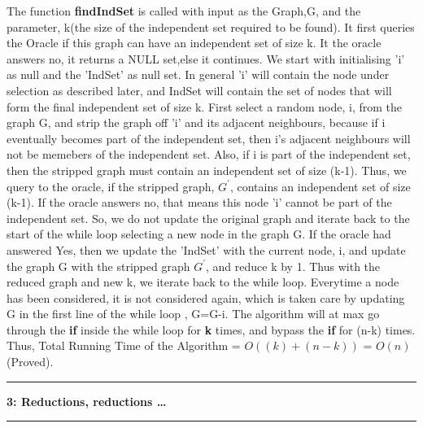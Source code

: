 \documentclass{article}
\newcommand\question[2]{\vspace{.25in}\hrule\textbf{#1: #2}\hrule\vspace{.10in}}
\begin{document}
    The function \textbf {findIndSet} is called with input as the Graph,G, and the parameter, k(the size of the independent set required to be found). It first queries the Oracle if this graph can have an independent set of size k. It the oracle answers no, it returns a NULL set,else it continues. We start with initialising 'i' as null and the 'IndSet' as null set. In general 'i' will contain the node under selection as described later, and IndSet will contain the set of nodes that will form the final independent set of size k. First select a random node, i,  from the graph G, and strip the graph off 'i' and its adjacent neighbours, because if i eventually becomes part of the independent set, then i's adjacent neighbours will not be memebers of the independent set. Also, if i is part of the independent set, then the stripped graph must contain an independent set of size (k-1). Thus, we query to the oracle, if the stripped graph, $G^\prime$, contains an independent set of size (k-1). If the oracle answers no, that means this node 'i' cannot be part of the independent set. So, we do not update the original graph and iterate back to the start of the while loop selecting a new node in the graph G. If the oracle had answered Yes, then we update the 'IndSet' with the current node, i, and update the graph G with the stripped graph $G^\prime$, and reduce k by 1. Thus with the reduced graph and new k, we iterate back to the while loop. Everytime a node has been considered, it is not considered again, which is taken care by updating G in the first line of the while loop , G=G-i. \newline
The algorithm will at max go through the \textbf {if} inside the while loop for \textbf {k} times, and bypass the \textbf {if} for (n-k) times. Thus, \newline
Total Running Time of the Algorithm = $O((k) + (n-k) )$ = $O(n)$ (Proved). \newline

\question{3}{Reductions, reductions \dots}
\end{document}
